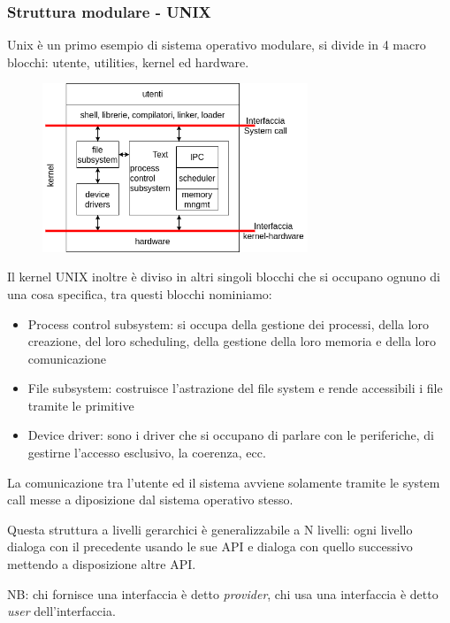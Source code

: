 \subsubsection{Struttura modulare - UNIX}
Unix è un primo esempio di sistema operativo modulare, si divide in 4 macro blocchi: utente, utilities, kernel ed hardware.
\begin{figure}[H]
    \centering
    \includegraphics[width=300px]{images/1_Introduzione/monolith.png}
\end{figure}

Il kernel UNIX inoltre è diviso in altri singoli blocchi che si occupano ognuno di una cosa specifica, tra questi blocchi nominiamo:
\begin{itemize}
    \item Process control subsystem: si occupa della gestione dei processi, della loro creazione, del loro scheduling, della gestione della loro memoria e della loro comunicazione
    \item File subsystem: costruisce l'astrazione del file system e rende accessibili i file tramite le primitive
    \item Device driver: sono i driver che si occupano di parlare con le periferiche, di gestirne l'accesso esclusivo, la coerenza, ecc.
\end{itemize}

La comunicazione tra l'utente ed il sistema avviene solamente tramite le system call messe a diposizione dal sistema operativo stesso.

Questa struttura a livelli gerarchici è generalizzabile a N livelli: ogni livello dialoga con il precedente usando le sue API e dialoga con quello successivo mettendo a disposizione altre API.

NB: chi fornisce una interfaccia è detto \emph{provider}, chi usa una interfaccia è detto \emph{user} dell'interfaccia.

